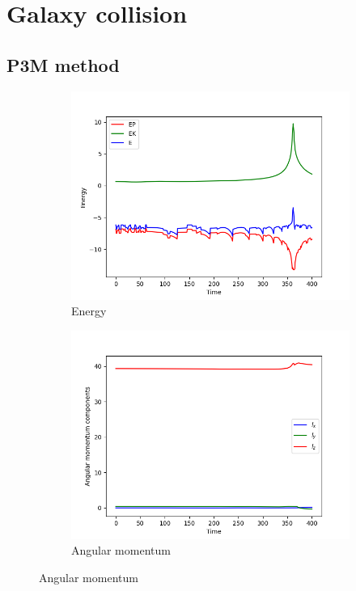 \section{Galaxy collision}
\subsection{P3M method}

\begin{figure}[htp]
    \centering
    \begin{subfigure}[b]{0.45\textwidth}
        \centering
        \includegraphics[width=\textwidth]{chapters/results/img/p3m-collision/energy.png}
        \caption{Energy}
        \label{fig:physical-quantities-p3m-collision-sub1}
    \end{subfigure}
    \hfill
    \begin{subfigure}[b]{0.45\textwidth}
        \centering
        \includegraphics[width=\textwidth]{chapters/results/img/p3m-collision/angular-momentum.png}
        \caption{Angular momentum}
        \label{fig:physical-quantities-p3m-collision-sub2}
    \end{subfigure}


\end{figure}
